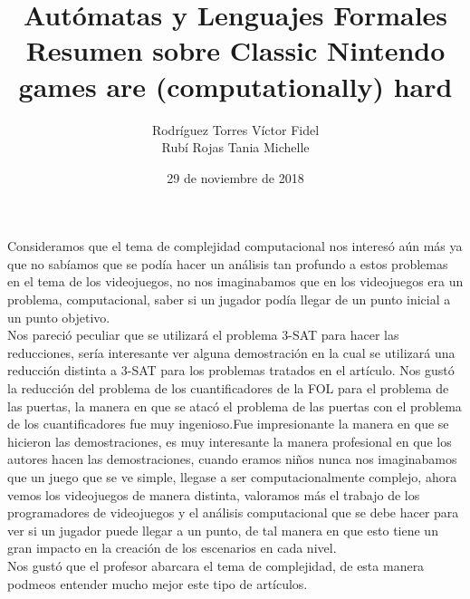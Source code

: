 \documentclass[letterpaper,12pt]{article}
\title{Autómatas y Lenguajes Formales\\ Resumen sobre Classic Nintendo games are (computationally) hard}
\author{Rodríguez Torres Víctor Fidel\\ Rubí Rojas Tania Michelle}
\date{29 de noviembre de 2018}
\begin{document}
\maketitle
Consideramos que el tema de complejidad computacional nos interesó aún más ya que no sabíamos que se podía hacer un análisis tan profundo a estos problemas en el tema de los videojuegos, no nos imaginabamos que en los videojuegos era un problema, computacional, saber si un jugador podía llegar de un punto inicial a un punto objetivo.\\

Nos pareció peculiar que se utilizará el problema 3-SAT para hacer las reducciones, sería interesante ver alguna demostración en la cual se utilizará una reducción distinta a 3-SAT para los problemas tratados en el artículo. Nos gustó la reducción del problema de los cuantificadores de la FOL para el problema de las puertas, la manera en que se atacó el problema de las puertas con el problema de los cuantificadores fue muy ingenioso.Fue impresionante la manera en que se hicieron las demostraciones, es muy interesante la manera profesional en que los autores hacen las demostraciones, cuando eramos niños nunca nos imaginabamos que un juego que se ve simple, llegase a ser computacionalmente complejo, ahora vemos los videojuegos de manera distinta, valoramos más el trabajo de los programadores de videojuegos y el análisis computacional que se debe hacer para ver si un jugador puede llegar a un punto, de tal manera en que esto tiene un gran impacto en la creación de los escenarios en cada nivel.\\

Nos gustó que el profesor abarcara el tema de complejidad, de esta manera podmeos entender mucho mejor este tipo de artículos. 
\end{document}
